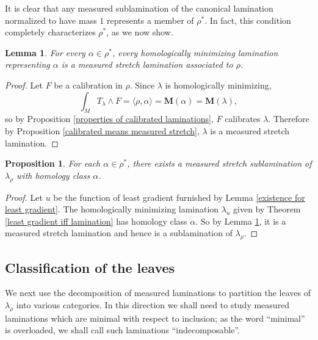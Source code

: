 \documentclass[reqno,11pt]{amsart}
\newcommand{\Mass}{\mathbf M}
\newtheorem{lemma}[theorem]{Lemma}
\newtheorem{proposition}[theorem]{Proposition}
\theoremstyle{definition}
\numberwithin{equation}{section}
\begin{document}
It is clear that any measured sublamination of the canonical lamination normalized to have mass $1$ represents a member of $\rho^*$.
In fact, this condition completely characterizes $\rho^*$, as we now show.

\begin{lemma}\label{homologically minimizing means measured stretch}
For every $\alpha \in \rho^*$, every homologically minimizing lamination representing $\alpha$ is a measured stretch lamination associated to $\rho$.
\end{lemma}
\begin{proof}
Let $F$ be a calibration in $\rho$.
Since $\lambda$ is homologically minimizing,
$$\int_M T_\lambda \wedge F = \langle \rho, \alpha\rangle = \Mass(\alpha) = \Mass(\lambda),$$
so by Proposition \ref{properties of calibrated laminations}, $F$ calibrates $\lambda$.
Therefore by Proposition \ref{calibrated means measured stretch}, $\lambda$ is a measured stretch lamination.
\end{proof}

\begin{proposition}\label{enough measures in canonical lamination}
For each $\alpha \in \rho^*$, there exists a measured stretch sublamination of $\lambda_\rho$ with homology class $\alpha$.
\end{proposition}
\begin{proof}
Let $u$ be the function of least gradient furnished by Lemma \ref{existence for least gradient}.
The homologically minimizing lamination $\lambda_u$ given by Theorem \ref{least gradient iff lamination} has homology class $\alpha$.
So by Lemma \ref{homologically minimizing means measured stretch}, it is a measured stretch lamination and hence is a sublamination of $\lambda_\rho$.
\end{proof}



\subsection{Classification of the leaves}
We next use the decomposition of measured laminations \cite[{\S}I.3]{Morgan88} to partition the leaves of $\lambda_\rho$ into various categories.
In this direction we shall need to study measured laminations which are minimal with respect to inclusion; as the word ``minimal'' is overloaded, we shall call such laminations ``indecomposable''.
\end{document}

